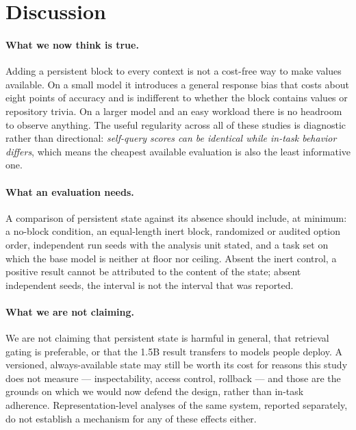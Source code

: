 \documentclass[11pt]{article}
\begin{document}
\section{Discussion}
\paragraph{What we now think is true.} Adding a persistent block to every context is not a cost-free way to make values available. On a small model it introduces a general response bias that costs about eight points of accuracy and is indifferent to whether the block contains values or repository trivia. On a larger model and an easy workload there is no headroom to observe anything. The useful regularity across all of these studies is diagnostic rather than directional: \emph{self-query scores can be identical while in-task behavior differs}, which means the cheapest available evaluation is also the least informative one.

\paragraph{What an evaluation needs.} A comparison of persistent state against its absence should include, at minimum: a no-block condition, an equal-length inert block, randomized or audited option order, independent run seeds with the analysis unit stated, and a task set on which the base model is neither at floor nor ceiling. Absent the inert control, a positive result cannot be attributed to the content of the state; absent independent seeds, the interval is not the interval that was reported.

\paragraph{What we are not claiming.} We are not claiming that persistent state is harmful in general, that retrieval gating is preferable, or that the 1.5B result transfers to models people deploy. A versioned, always-available state may still be worth its cost for reasons this study does not measure --- inspectability, access control, rollback --- and those are the grounds on which we would now defend the design, rather than in-task adherence. Representation-level analyses of the same system, reported separately, do not establish a mechanism for any of these effects either.
\end{document}

